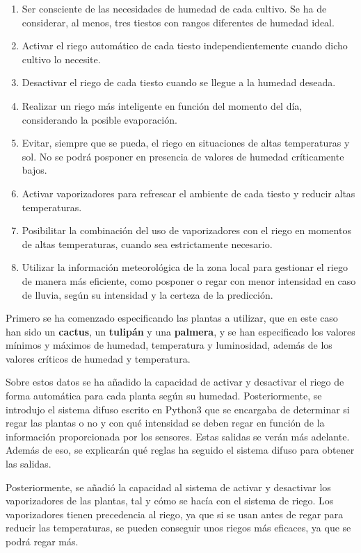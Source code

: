 \documentclass[11pt,a4paper]{article}
\begin{document}
\begin{enumerate}
	\item Ser consciente de las necesidades de humedad de cada cultivo. Se ha de considerar, al menos, tres tiestos con rangos
	diferentes de humedad ideal.
	\item Activar el riego automático de cada tiesto independientemente cuando dicho cultivo lo necesite.
	\item Desactivar el riego de cada tiesto cuando se llegue a la humedad deseada.
	\item Realizar un riego más inteligente en función del momento del día, considerando la posible evaporación.
	\item Evitar, siempre que se pueda, el riego en situaciones de altas temperaturas y sol. No se podrá posponer en presencia de
	valores de humedad críticamente bajos.
	\item Activar vaporizadores para refrescar el ambiente de cada tiesto y reducir altas temperaturas.
	\item Posibilitar la combinación del uso de vaporizadores con el riego en momentos de altas temperaturas, cuando sea
	estrictamente necesario.
	\item Utilizar la información meteorológica de la zona local para gestionar el riego de manera más eficiente, como posponer o
	regar con menor intensidad en caso de lluvia, según su intensidad y la certeza de la predicción.
\end{enumerate}

Primero se ha comenzado especificando las plantas a utilizar, que en este caso han sido un \textbf{cactus}, un \textbf{tulipán}
y una \textbf{palmera}, y se han especificado los valores mínimos y máximos de humedad, temperatura y luminosidad, además de los
valores críticos de humedad y temperatura.

Sobre estos datos se ha añadido la capacidad de activar y desactivar el riego de forma automática para cada planta según
su humedad. Posteriormente, se introdujo el sistema difuso escrito en Python3 que se encargaba de determinar si regar las plantas
o no y con qué intensidad se deben regar en función de la información proporcionada por los sensores. Estas salidas se verán
más adelante. Además de eso, se explicarán qué reglas ha seguido el sistema difuso para obtener las salidas.

Posteriormente, se añadió la capacidad al sistema de activar y desactivar los vaporizadores de las plantas, tal y cómo se hacía con
el sistema de riego. Los vaporizadores tienen precedencia al riego, ya que si se usan antes de regar para reducir las temperaturas,
se pueden conseguir unos riegos más eficaces, ya que se podrá regar más.
\end{document}
